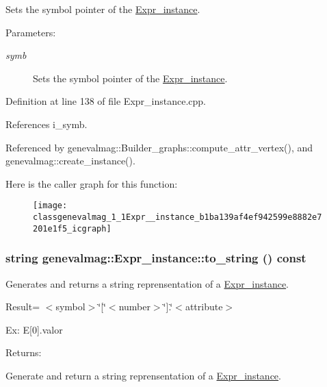 Sets the symbol pointer of the \hyperlink{classgenevalmag_1_1Expr__instance}{Expr\_\-instance}. \begin{Desc}
\item[Parameters:]
\begin{description}
\item[{\em symb}]Sets the symbol pointer of the \hyperlink{classgenevalmag_1_1Expr__instance}{Expr\_\-instance}. \end{description}
\end{Desc}


Definition at line 138 of file Expr\_\-instance.cpp.

References i\_\-symb.

Referenced by genevalmag::Builder\_\-graphs::compute\_\-attr\_\-vertex(), and genevalmag::create\_\-instance().

Here is the caller graph for this function:\nopagebreak
\begin{figure}[H]
\begin{center}
\leavevmode
\texttt{[image: classgenevalmag\_1\_1Expr\_\_instance\_b1ba139af4ef942599e8882e7201e1f5\_icgraph]}
\end{center}
\end{figure}
\hypertarget{classgenevalmag_1_1Expr__instance_2186bb2f69173f709cfb75435b32da94}{
\subsubsection[{to\_\-string}]{\setlength{\rightskip}{0pt plus 5cm}string genevalmag::Expr\_\-instance::to\_\-string () const}}
\label{classgenevalmag_1_1Expr__instance_2186bb2f69173f709cfb75435b32da94}


Generates and returns a string reprensentation of a \hyperlink{classgenevalmag_1_1Expr__instance}{Expr\_\-instance}.\par
 \par
 Result= $<$symbol$>$\char`\"{}\mbox{[}\char`\"{}$<$number$>$\char`\"{}\mbox{]}.\char`\"{}$<$attribute$>$\par
 \par
 Ex: E\mbox{[}0\mbox{]}.valor\par
 \begin{Desc}
\item[Returns:]\end{Desc}
Generate and return a string reprensentation of a \hyperlink{classgenevalmag_1_1Expr__instance}{Expr\_\-instance}.

